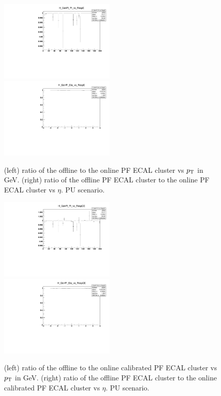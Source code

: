\begin{figure}
\includegraphics[width=0.495\textwidth]{./plots_pdf/ECAL_plots/Prod6/PU/H_GenPi_Pt_vs_RespE.pdf}
\includegraphics[width=0.495\textwidth]{./plots_pdf/ECAL_plots/Prod6/PU/H_GenPi_Eta_vs_RespE.pdf}
\caption [HLT vs offline PF ECAL cluster - PU scenario]{(left) ratio of the offline to the online PF ECAL cluster vs $p_{\mathrm{T}}$ in GeV. (right) ratio of the offline PF ECAL cluster to the online PF ECAL cluster vs $\eta$. PU scenario.}
\label{fig:PU_ECAL_Offline_vs_Online_E}
\end{figure}

\begin{figure}
\includegraphics[width=0.495\textwidth]{./plots_pdf/ECAL_plots/Prod6/PU/H_GenPi_Pt_vs_RespCE.pdf}
\includegraphics[width=0.495\textwidth]{./plots_pdf/ECAL_plots/Prod6/PU/H_GenPi_Eta_vs_RespCE.pdf}
\caption[HLT vs offline calibrated PF ECAL cluster - PU scenario]{(left) ratio of the offline to the online calibrated PF ECAL cluster vs $p_{\mathrm{T}}$ in GeV. (right) ratio of the offline PF ECAL cluster to the online calibrated PF ECAL cluster vs $\eta$. PU scenario.}
\label{fig:PU_ECAL_Offline_vs_Online_CE}
\end{figure}       
